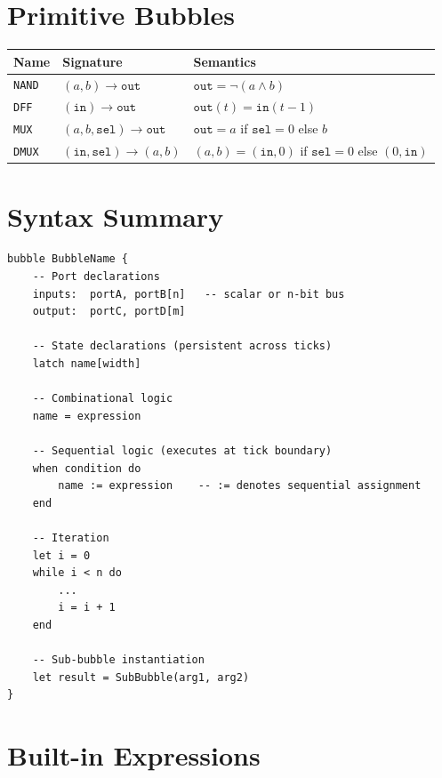 \documentclass[11pt,a4paper,openany]{book}
\theoremstyle{plain}
\theoremstyle{definition}
\theoremstyle{remark}
\newcommand{\AND}{\ensuremath{\wedge}}
\newcommand{\NOT}{\ensuremath{\neg}}
\begin{document}
\section{Primitive Bubbles}

\begin{center}
\begin{tabular}{lll}
  \toprule
  \textbf{Name} & \textbf{Signature} & \textbf{Semantics} \\
  \midrule
  \texttt{NAND} & $(a, b) \to \texttt{out}$
                & $\texttt{out} = \NOT(a \AND b)$ \\
  \texttt{DFF}  & $(\texttt{in}) \to \texttt{out}$
                & $\texttt{out}(t) = \texttt{in}(t-1)$ \\
  \texttt{MUX}  & $(a, b, \texttt{sel}) \to \texttt{out}$
                & $\texttt{out} = a$ if $\texttt{sel}=0$ else $b$ \\
  \texttt{DMUX} & $(\texttt{in}, \texttt{sel}) \to (a, b)$
                & $(a,b) = (\texttt{in},0)$ if $\texttt{sel}=0$ else $(0,\texttt{in})$ \\
  \bottomrule
\end{tabular}
\end{center}

\section{Syntax Summary}

\begin{lstlisting}[caption={Bubble declaration syntax}]
bubble BubbleName {
    -- Port declarations
    inputs:  portA, portB[n]   -- scalar or n-bit bus
    output:  portC, portD[m]

    -- State declarations (persistent across ticks)
    latch name[width]

    -- Combinational logic
    name = expression

    -- Sequential logic (executes at tick boundary)
    when condition do
        name := expression    -- := denotes sequential assignment
    end

    -- Iteration
    let i = 0
    while i < n do
        ...
        i = i + 1
    end

    -- Sub-bubble instantiation
    let result = SubBubble(arg1, arg2)
}
\end{lstlisting}

\section{Built-in Expressions}
\end{document}
